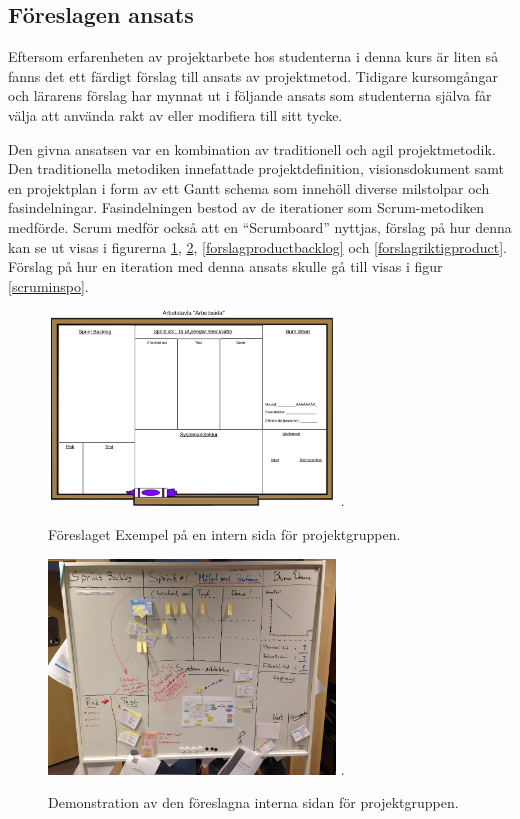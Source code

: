 \documentclass[conference,a4paper]{IEEEtran}
\begin{document}
\subsection{Föreslagen ansats}
Eftersom erfarenheten av projektarbete hos studenterna i denna kurs är liten så fanns det ett färdigt förslag till ansats av projektmetod. Tidigare kursomgångar och lärarens förslag har mynnat ut i följande ansats som studenterna själva får välja att använda rakt av eller modifiera till sitt tycke.

Den givna ansatsen var en kombination av traditionell och agil projektmetodik. Den traditionella metodiken innefattade projektdefinition, visionsdokument samt en projektplan i form av ett Gantt schema som innehöll diverse milstolpar och fasindelningar. Fasindelningen bestod av de iterationer som Scrum-metodiken medförde. Scrum medför också att en ``Scrumboard'' nyttjas, förslag på hur denna kan se ut visas i figurerna \ref{forslagsprintbacklog}, \ref{forslagriktigsprint}, \ref{forslagproductbacklog} och \ref{forslagriktigproduct}. Förslag på hur en iteration med denna ansats skulle gå till visas i figur \ref{scruminspo}.

\begin{figure}[H]
\centering
\includegraphics[width=3in]{forslagsprintbacklog}
\DeclareGraphicsExtensions.
\caption{Föreslaget Exempel på en intern sida för projektgruppen.}
\label{forslagsprintbacklog}
\end{figure}

\begin{figure}[H]
\centering
\includegraphics[width=3in]{forslagriktigsprint}
\DeclareGraphicsExtensions.
\caption{Demonstration av den föreslagna interna sidan för projektgruppen.}
\label{forslagriktigsprint}
\end{figure}
\end{document}
